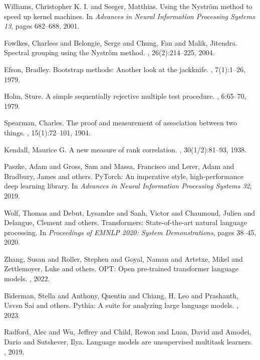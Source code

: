 \documentclass[11pt]{article}
\newcommand{\1}{\mathbf{1}}
\begin{document}
\begin{thebibliography}{99}
Williams, Christopher K. I. and Seeger, Matthias.
\newblock Using the Nystr\"om method to speed up kernel machines.
\newblock In {\em Advances in Neural Information Processing Systems 13}, pages 682--688, 2001.

Fowlkes, Charless and Belongie, Serge and Chung, Fan and Malik, Jitendra.
\newblock Spectral grouping using the Nystr\"om method.
, 26(2):214--225, 2004.

Efron, Bradley.
\newblock Bootstrap methods: Another look at the jackknife.
, 7(1):1--26, 1979.

Holm, Sture.
\newblock A simple sequentially rejective multiple test procedure.
, 6:65--70, 1979.

Spearman, Charles.
\newblock The proof and measurement of association between two things.
, 15(1):72--101, 1904.

Kendall, Maurice G.
\newblock A new measure of rank correlation.
, 30(1/2):81--93, 1938.

Paszke, Adam and Gross, Sam and Massa, Francisco and Lerer, Adam and Bradbury, James and others.
\newblock PyTorch: An imperative style, high-performance deep learning library.
\newblock In {\em Advances in Neural Information Processing Systems 32}, 2019.

Wolf, Thomas and Debut, Lysandre and Sanh, Victor and Chaumond, Julien and Delangue, Clement and others.
\newblock Transformers: State-of-the-art natural language processing.
\newblock In {\em Proceedings of EMNLP 2020: System Demonstrations}, pages 38--45, 2020.

Zhang, Susan and Roller, Stephen and Goyal, Naman and Artetxe, Mikel and Zettlemoyer, Luke and others.
\newblock OPT: Open pre-trained transformer language models.
, 2022.

Biderman, Stella and Anthony, Quentin and Chiang, H. Leo and Prashanth, Usvsn Sai and others.
\newblock Pythia: A suite for analyzing large language models.
, 2023.

Radford, Alec and Wu, Jeffrey and Child, Rewon and Luan, David and Amodei, Dario and Sutskever, Ilya.
\newblock Language models are unsupervised multitask learners.
, 2019.


\end{thebibliography}
\end{document}
